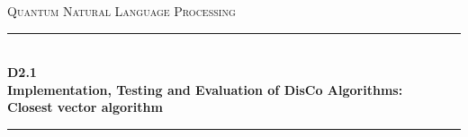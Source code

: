 \documentclass[11pt]{article}
\begin{document}
\begin{titlepage}
\newcommand{\HRule}{\rule{\linewidth}{0.1mm}} 
\center %
 
\setlength{\arrayrulewidth}{1mm}
\setlength{\tabcolsep}{18pt}
\renewcommand{\arraystretch}{2.5}
 
\vfill
\textsc{\LARGE Quantum Natural Language Processing}
\vfill
\HRule \\[0.4cm]
{ \Large \bfseries D2.1} \\[0.3cm]
{ \Large \bfseries Implementation, Testing and Evaluation of DisCo Algorithms: \\[0.1cm]Closest vector algorithm}\\[0.1cm]
\HRule \\[1.5cm]
 

\end{titlepage}
\end{document}
